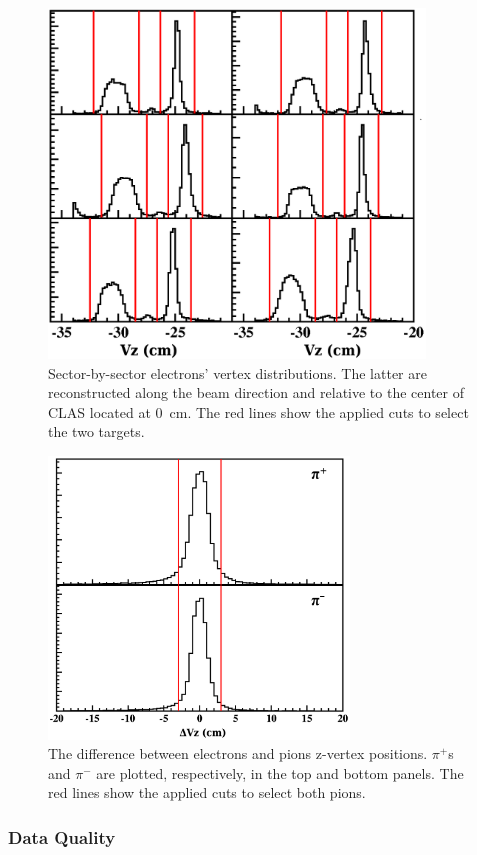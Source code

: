 \begin{figure}[p]
\centering
\includegraphics[width=10cm] {chap5-fig/Vertex_el_data.png}
\caption {Sector-by-sector electrons' vertex distributions. The latter are reconstructed along the beam direction and relative to the center of CLAS located at 0~cm. The red lines show the applied cuts to select the two targets.}
\label{vertex}
\end{figure}

\begin{figure}[tbp]
\centering
\includegraphics[width=8cm] {chap5-fig/Vertex_pi_data.png}
\caption {The difference between electrons and pions z-vertex positions. $\pi^+$s and $\pi^-$ are plotted, respectively, in the top and bottom panels. The red lines show the applied cuts to select both pions.}
\label{fig:dvzpi}
\end{figure}

\subsubsection{Data Quality}

